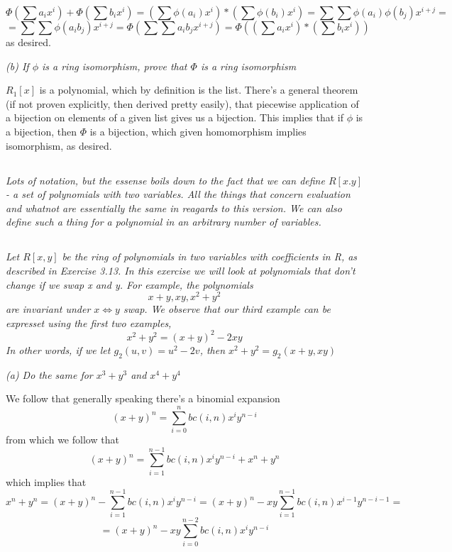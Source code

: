 \documentclass[11pt,oneside,titlepage]{book}
\DeclareMathOperator \lra {\Leftrightarrow}
\begin{document}
$$ \Phi(\sum{a_i x^i}) + \Phi(\sum{b_i x^i}) =
(\sum{\phi(a_i) x^i}) * ( \sum{\phi(b_i) x^i}) = \sum{\sum{\phi(a_i) \phi(b_j) x^{i + j}}} = $$
$$ = \sum{\sum{\phi(a_i b_j) x^{i + j}}} = \Phi(\sum{\sum{a_i b_j x^{i + j}}}) =
\Phi((\sum{a_i x^i}) * (\sum{b_i x^i}))$$
as desired.

\textit{(b) If $\phi$ is a ring isomorphism, prove that $\Phi$ is a
ring isomorphism}

$R_1[x]$ is a polynomial, which by definition is the list. There's a
general theorem (if not proven explicitly, then derived pretty
easily), that piecewise application of a bijection on elements of a
given list gives us a bijection. This implies that if $\phi$ is a
bijection, then $\Phi$ is a bijection, which given homomorphism
implies isomorphism, as desired.

\subsection{}

\textit{Lots of notation, but the essense boils down to the fact that
we can define $R[x. y]$ - a set of polynomials with two variables. All
the things that concern evaluation and whatnot are essentially the
same in reagards to this version. We can also define such a thing for
a polynomial in an arbitrary number of variables.}

\subsection{}

\textit{Let $R[x, y]$ be the ring of polynomials in two variables with
coefficients in R, as described in Exercise 3.13. In this exercise we
will look at polynomials that don’t change if we swap x and y. For
example, the polynomials
$$x + y, xy, x^2 + y^2$$
are invariant under $x \lra y$ swap. We observe that our third example
can be expresset using the first two examples,
$$x^2 + y^2 = (x + y)^2 - 2xy$$
In other words, if we let $g_2(u, v) = u^2 - 2v$, then $x^2 + y^2 = g_2(x + y, xy)$}

\textit{(a) Do the same for $x^3 + y^3$ and $x^4 + y^4$}

We follow that generally speaking there's a binomial expansion
$$(x + y)^n = \sum_{i = 0}^n {bc(i, n)x^iy^{n - i}}$$
from which we follow that
$$(x + y)^n = \sum_{i = 1}^{n - 1} {bc(i, n)x^iy^{n - i}} + x^n + y^n$$
which implies that
$$ x^n + y^n = (x + y)^n -  \sum_{i = 1}^{n - 1} {bc(i, n)x^iy^{n - i}} =
(x + y)^n -  xy \sum_{i = 1}^{n - 1} {bc(i, n)x^{i - 1}y^{n - i - 1}} = $$
$$ = (x + y)^n -  xy \sum_{i = 0}^{n - 2} {bc(i, n)x^{i}y^{n - i}} $$
\end{document}
